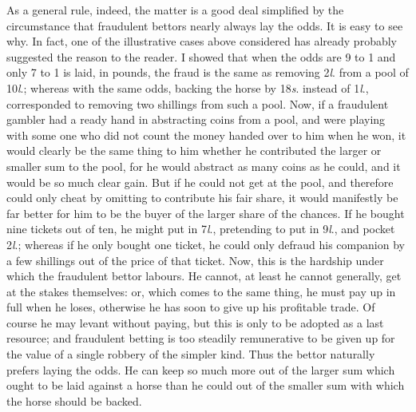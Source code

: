 \documentclass[letterpaper,12pt,oneside,openany]{memoir}
\begin{document}
As a general rule, indeed, the matter is a good deal
simplified by the circumstance that fraudulent bettors
nearly always lay the odds. It is easy to see why. In
fact, one of the illustrative cases above considered has
already probably suggested the reason to the reader.
I showed that when the odds are 9 to 1 and only 7 to 1
is laid, in pounds, the fraud is the same as removing 2\textit{l}.
from a pool of 10\textit{l}.; whereas with the same odds,
backing the horse by 18\textit{s}. instead of 1\textit{l}., corresponded
to removing two shillings from such a pool. Now, if
a fraudulent gambler had a ready hand in abstracting
coins from a pool, and were playing with some one who
did not count the money handed over to him when he
won, it would clearly be the same thing to him whether
he contributed the larger or smaller sum to the pool, for
he would abstract as many coins as he could, and it
would be so much clear gain. But if he could not get
at the pool, and therefore could only cheat by omitting
to contribute his fair share, it would manifestly be far
better for him to be the buyer of the larger share of the
chances. If he bought nine tickets out of ten, he
might put in 7\textit{l}., pretending to put in 9\textit{l}., and pocket
2\textit{l}.; whereas if he only bought one ticket, he could only
defraud his companion by a few shillings out of the
price of that ticket. Now, this is the hardship under
which the fraudulent bettor labours. He cannot, at
least he cannot generally, get at the stakes themselves:
or, which comes to the same thing, he must pay up
in full when he loses, otherwise he has soon to give up
his profitable trade. Of course he may levant without
paying, but this is only to be adopted as a last resource;
and fraudulent betting is too steadily remunerative to
be given up for the value of a single robbery of the
simpler kind. Thus the bettor naturally prefers laying
the odds. He can keep so much more out of the larger
sum which ought to be laid against a horse than he
could out of the smaller sum with which the horse
should be backed.
\end{document}
